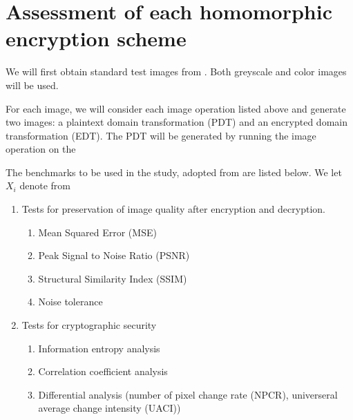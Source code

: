 \section{Assessment of each homomorphic encryption scheme}

We will first obtain standard test images from \cite{gonzalez_image_nodate}. Both greyscale and color images will be used.

For each image, we will consider each image operation listed above and generate two images: a plaintext domain transformation (PDT) and an encrypted domain transformation (EDT). The PDT will be generated by running the image operation on the

The benchmarks to be used in the study, adopted from \cite{ahmed_benchmark_2016, ahmad_efficiency_2012, wu_npcr_2011} are listed below. We let $X_i$ denote from
\begin{enumerate}
	\item Tests for preservation of image quality after encryption and decryption.
	\begin{enumerate}
		\item Mean Squared Error (MSE)

		\item Peak Signal to Noise Ratio (PSNR)
		\item Structural Similarity Index (SSIM)
		\item Noise tolerance
	\end{enumerate}
	\item Tests for cryptographic security
	\begin{enumerate}
		\item Information entropy analysis
		\item Correlation coefficient analysis
		\item Differential analysis (number of pixel change rate (NPCR), universeral average change intensity (UACI))
	\end{enumerate}
\end{enumerate}
